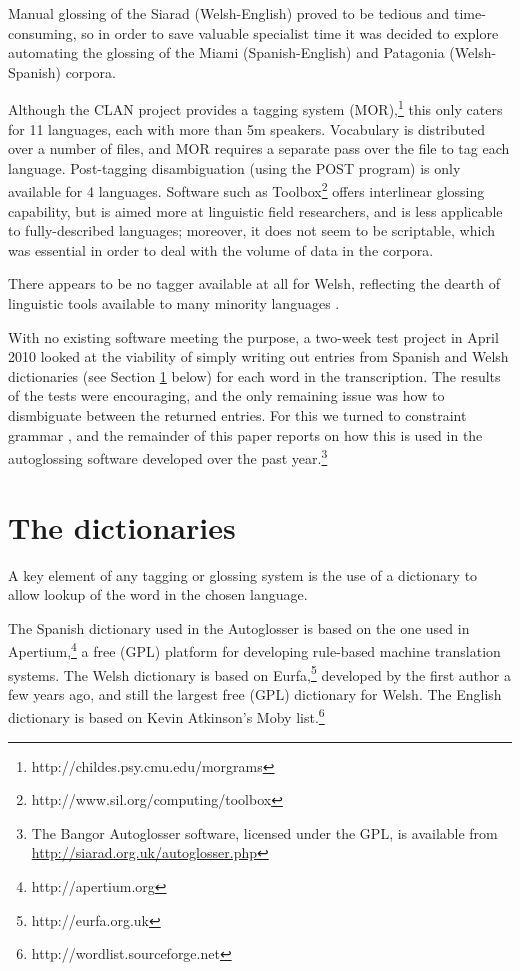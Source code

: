 \documentclass[11pt]{article}
\begin{document}
Manual glossing of the Siarad (Welsh-English) proved to be tedious and time-consuming, so in order to save valuable specialist time it was decided to explore automating the glossing of the Miami (Spanish-English) and Patagonia (Welsh-Spanish) corpora.

Although the CLAN project provides a tagging system (MOR),\footnote{http://childes.psy.cmu.edu/morgrams} this only caters for 11 languages, each with more than 5m speakers.  Vocabulary is distributed over a number of files, and MOR requires a separate pass over the file to tag each language.  Post-tagging disambiguation (using the POST program) is only available for 4 languages.  Software such as Toolbox\footnote{http://www.sil.org/computing/toolbox} offers interlinear glossing capability, but is aimed more at linguistic field researchers, and is less applicable to fully-described languages; moreover, it does not seem to be scriptable, which was essential in order to deal with the volume of data in the corpora.

There appears to be no tagger available at all for Welsh, reflecting the dearth of linguistic tools available to many minority languages \cite{antonsen2010}.

With no existing software meeting the purpose, a two-week test project in April 2010 looked at the viability of simply writing out entries from Spanish and Welsh dictionaries (see Section \ref{sec:dictionaries} below) for each word in the transcription.  The results of the tests were encouraging, and the only remaining issue was how to dismbiguate between the returned entries.  For this we turned to constraint grammar \cite{karlsson1995}, and the remainder of this paper reports on how this is used in the autoglossing software developed over the past year.\footnote{The Bangor Autoglosser software, licensed under the GPL, is available from \url{http://siarad.org.uk/autoglosser.php}}


\section{The dictionaries}
\label{sec:dictionaries}


A key element of any tagging or glossing system is the use of a dictionary to allow lookup of the word in the chosen language.
  
The Spanish dictionary used in the Autoglosser is based on the one used in Apertium,\footnote{http://apertium.org} a free (GPL) platform for developing rule-based machine translation systems.  The Welsh dictionary is based on Eurfa,\footnote{http://eurfa.org.uk} developed by the first author a few years ago, and still the largest free (GPL) dictionary for Welsh.  The English dictionary is based on Kevin Atkinson's Moby list.\footnote{http://wordlist.sourceforge.net}
\end{document}
